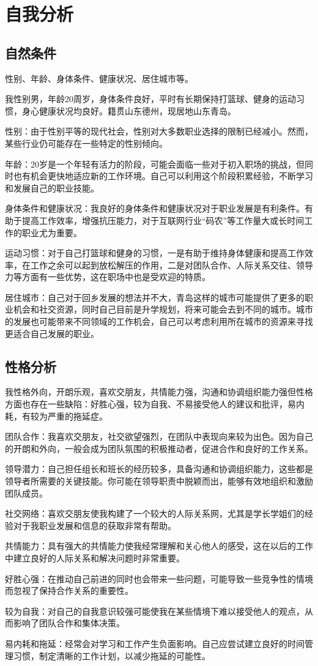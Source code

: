 \documentclass{article}
\begin{document}
\thispagestyle{empty}
\newpage
\setcounter{page}{1}
\section{自我分析}
\subsection{自然条件}
性别、年龄、身体条件、健康状况、居住城市等。\par
我性别男，年龄20周岁，身体条件良好，平时有长期保持打篮球、健身的运动习惯，身心健康状况均良好。籍贯山东德州，现居地山东青岛。\par
性别：由于性别平等的现代社会，性别对大多数职业选择的限制已经减小。然而，某些行业仍可能存在一些特定的性别倾向。\par
年龄：20岁是一个年轻有活力的阶段，可能会面临一些对于初入职场的挑战，但同时也有机会更快地适应新的工作环境。自己可以利用这个阶段积累经验，不断学习和发展自己的职业技能。\par
身体条件和健康状况：我良好的身体条件和健康状况对于职业发展是有利条件。有助于提高工作效率，增强抗压能力，对于互联网行业“码农”等工作量大或长时间工作的职业尤为重要。\par
运动习惯：对于自己打篮球和健身的习惯，一是有助于维持身体健康和提高工作效率，在工作之余可以起到放松解压的作用，二是对团队合作、人际关系交往、领导力等方面有一些优势，这在职场中也是受欢迎的特质。\par
居住城市：自己对于回乡发展的想法并不大，青岛这样的城市可能提供了更多的职业机会和社交资源，同时自己目前是升学规划，将来可能会去到不同的城市。城市的发展也可能带来不同领域的工作机会，自己可以考虑利用所在城市的资源来寻找更适合自己发展的职业。\par
\subsection{性格分析}
我性格外向，开朗乐观，喜欢交朋友，共情能力强，沟通和协调组织能力强但性格方面也存在一些缺陷：好胜心强，较为自我、不易接受他人的建议和批评，易内耗，有较为严重的拖延症。\par
团队合作：我喜欢交朋友，社交欲望强烈，在团队中表现向来较为出色。因为自己的开朗和外向，一般会成为团队氛围的积极推动者，促进合作和良好的工作关系。\par
领导潜力：自己担任组长和班长的经历较多，具备沟通和协调组织能力，这些都是领导者所需要的关键技能。你可能在领导职责中脱颖而出，能够有效地组织和激励团队成员。\par
社交网络：喜欢交朋友使我构建了一个较大的人际关系网，尤其是学长学姐们的经验对于我职业发展和信息的获取非常有帮助。\par
共情能力：具有强大的共情能力使我经常理解和关心他人的感受，这在以后的工作中建立良好的人际关系和解决问题时非常重要。\par
好胜心强：在推动自己前进的同时也会带来一些问题，可能导致一些竞争性的情境而忽视了保持合作关系的重要性。\par
较为自我：对自己的自我意识较强可能使我在某些情境下难以接受他人的观点，从而影响了团队合作和集体决策。\par
易内耗和拖延：经常会对学习和工作产生负面影响。自己应尝试建立良好的时间管理习惯，制定清晰的工作计划，以减少拖延的可能性。\par
\end{document}
